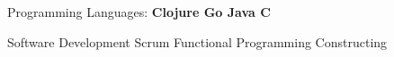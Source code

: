 

\begin{cvskills}

  \cvskill
    {Programming Languages:}
    {\textbf{Clojure \hspace{10pt} Go \hspace{10pt} Java \hspace{10pt} C}}
  
  \cvskill
  	{Software Development}
  	{Scrum \hspace{10pt} Functional Programming \hspace{10pt} Constructing }
 

\end{cvskills}
